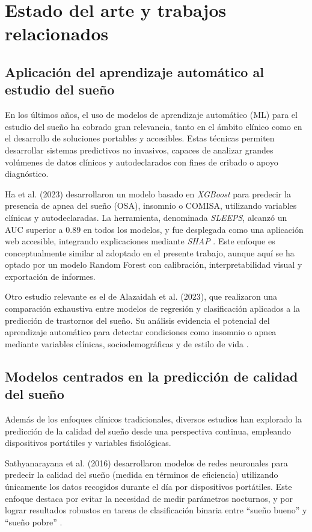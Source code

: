 \section{Estado del arte y trabajos relacionados}

\subsection{Aplicación del aprendizaje automático al estudio del sueño}

En los últimos años, el uso de modelos de aprendizaje automático (ML) para el estudio del sueño ha cobrado gran relevancia, tanto en el ámbito clínico como en el desarrollo de soluciones portables y accesibles. Estas técnicas permiten desarrollar sistemas predictivos no invasivos, capaces de analizar grandes volúmenes de datos clínicos y autodeclarados con fines de cribado o apoyo diagnóstico.

Ha et al. (2023) desarrollaron un modelo basado en \textit{XGBoost} para predecir la presencia de apnea del sueño (OSA), insomnio o COMISA, utilizando variables clínicas y autodeclaradas. La herramienta, denominada \textit{SLEEPS}, alcanzó un AUC superior a 0.89 en todos los modelos, y fue desplegada como una aplicación web accesible, integrando explicaciones mediante \textit{SHAP} \cite{ha2023sleeps}. Este enfoque es conceptualmente similar al adoptado en el presente trabajo, aunque aquí se ha optado por un modelo Random Forest con calibración, interpretabilidad visual y exportación de informes.

Otro estudio relevante es el de Alazaidah et al. (2023), que realizaron una comparación exhaustiva entre modelos de regresión y clasificación aplicados a la predicción de trastornos del sueño. Su análisis evidencia el potencial del aprendizaje automático para detectar condiciones como insomnio o apnea mediante variables clínicas, sociodemográficas y de estilo de vida \cite{alazaidah2023potential}.


\subsection{Modelos centrados en la predicción de calidad del sueño}

Además de los enfoques clínicos tradicionales, diversos estudios han explorado la predicción de la calidad del sueño desde una perspectiva continua, empleando dispositivos portátiles y variables fisiológicas.

Sathyanarayana et al. (2016) desarrollaron modelos de redes neuronales para predecir la calidad del sueño (medida en términos de eficiencia) utilizando únicamente los datos recogidos durante el día por dispositivos portátiles. Este enfoque destaca por evitar la necesidad de medir parámetros nocturnos, y por lograr resultados robustos en tareas de clasificación binaria entre “sueño bueno” y “sueño pobre” \cite{sathyanarayana2016sleep}.

